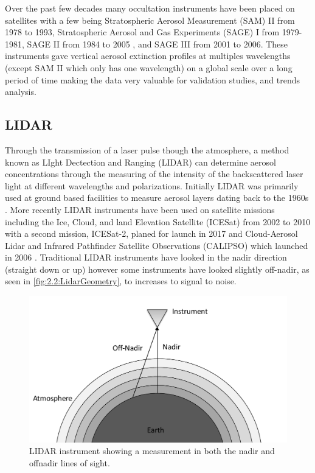 Over the past few decades many occultation instruments have been placed on satellites with a few being Stratospheric Aerosol Measurement (SAM) II from 1978 to 1993, Stratospheric Aerosol and Gas Experiments (SAGE) I \citep{McCormick1979} from 1979-1981, SAGE II \citep{McCormick1987} from 1984 to 2005 , and SAGE III \citep{Thomason2003} from 2001 to 2006. These instruments gave vertical aerosol extinction profiles at multiples wavelengths (except SAM II which only has one wavelength) on a global scale over a long period of time making the data very valuable for validation studies, and trends analysis.

\subsection{LIDAR}

Through the transmission of a laser pulse though the atmosphere, a method known as LIght Dectection and Ranging (LIDAR) can determine aerosol concentrations through the measuring of the intensity of the backscattered laser light at different wavelengths and polarizations. Initially LIDAR was primarily used at ground based facilities to measure aerosol layers dating back to the 1960s \citep{Fiocco1964}. More recently LIDAR instruments have been used on satellite missions including the Ice, Cloud, and land Elevation Satellite (ICESat) from 2002 to 2010 \citep{Schutz2005} with a second mission, ICESat-2, planed for launch in 2017 and Cloud-Aerosol Lidar and Infrared Pathfinder Satellite Observations (CALIPSO) which launched in 2006 \citep{Winker2007}. Traditional LIDAR instruments have looked in the nadir direction (straight down or up) however some instruments have looked slightly off-nadir, as seen in \autoref{fig:2.2:LidarGeometry}, to increases to signal to noise.

\begin{figure}[h!]
    \includegraphics[width=1.0\textwidth]{./Images/2-2-LidarGeometry.pdf}
    \caption[LIDAR Geometry]{LIDAR instrument showing a measurement in both the nadir and offnadir lines of sight.}
    \label{fig:2.2:LidarGeometry}
\end{figure}

